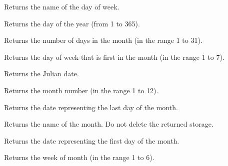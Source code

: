 Returns the name of the day of week.

\label{wxdategetdayofyear}


Returns the day of the year (from 1 to 365).

\label{wxdategetdaysinmonth}


Returns the number of days in the month (in the range 1 to 31).

\label{wxdategetfirstdayofmonth}


Returns the day of week that is first in the month (in the range 1 to 7).

\label{wxdategetjuliandate}


Returns the Julian date.

\label{wxdategetmonth}


Returns the month number (in the range 1 to 12).



Returns the date representing the last day of the month.

\label{wxdategetmonthname}


Returns the name of the month. Do not delete the returned storage.

\label{wxdategetmonthstart}


Returns the date representing the first day of the month.

\label{wxdategetweekofmonth}


Returns the week of month (in the range 1 to 6).

\label{wxdategetweekofyear}

